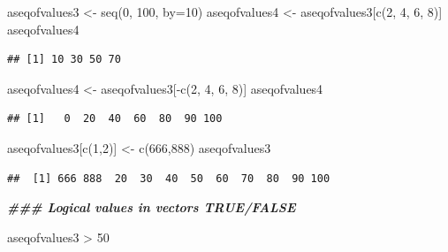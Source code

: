\documentclass[
]{book}
\newenvironment{Shaded}{\begin{snugshade}}{\end{snugshade}}
\newcommand{\AttributeTok}[1]{\textcolor[rgb]{0.77,0.63,0.00}{#1}}
\newcommand{\DecValTok}[1]{\textcolor[rgb]{0.00,0.00,0.81}{#1}}
\newcommand{\DocumentationTok}[1]{\textcolor[rgb]{0.56,0.35,0.01}{\textbf{\textit{#1}}}}
\newcommand{\FunctionTok}[1]{\textcolor[rgb]{0.00,0.00,0.00}{#1}}
\newcommand{\NormalTok}[1]{#1}
\newcommand{\OtherTok}[1]{\textcolor[rgb]{0.56,0.35,0.01}{#1}}
\newcommand{\SpecialCharTok}[1]{\textcolor[rgb]{0.00,0.00,0.00}{#1}}
\begin{document}
\begin{Shaded}
\begin{Highlighting}[]
\NormalTok{aseqofvalues3 }\OtherTok{\textless{}{-}} \FunctionTok{seq}\NormalTok{(}\DecValTok{0}\NormalTok{, }\DecValTok{100}\NormalTok{, }\AttributeTok{by=}\DecValTok{10}\NormalTok{)}
\NormalTok{aseqofvalues4 }\OtherTok{\textless{}{-}}\NormalTok{ aseqofvalues3[}\FunctionTok{c}\NormalTok{(}\DecValTok{2}\NormalTok{, }\DecValTok{4}\NormalTok{, }\DecValTok{6}\NormalTok{, }\DecValTok{8}\NormalTok{)]}
\NormalTok{aseqofvalues4}
\end{Highlighting}
\end{Shaded}

\begin{verbatim}
## [1] 10 30 50 70
\end{verbatim}

\begin{Shaded}
\begin{Highlighting}[]
\NormalTok{aseqofvalues4 }\OtherTok{\textless{}{-}}\NormalTok{ aseqofvalues3[}\SpecialCharTok{{-}}\FunctionTok{c}\NormalTok{(}\DecValTok{2}\NormalTok{, }\DecValTok{4}\NormalTok{, }\DecValTok{6}\NormalTok{, }\DecValTok{8}\NormalTok{)]}
\NormalTok{aseqofvalues4}
\end{Highlighting}
\end{Shaded}

\begin{verbatim}
## [1]   0  20  40  60  80  90 100
\end{verbatim}

\begin{Shaded}
\begin{Highlighting}[]
\NormalTok{aseqofvalues3[}\FunctionTok{c}\NormalTok{(}\DecValTok{1}\NormalTok{,}\DecValTok{2}\NormalTok{)] }\OtherTok{\textless{}{-}} \FunctionTok{c}\NormalTok{(}\DecValTok{666}\NormalTok{,}\DecValTok{888}\NormalTok{)}
\NormalTok{aseqofvalues3}
\end{Highlighting}
\end{Shaded}

\begin{verbatim}
##  [1] 666 888  20  30  40  50  60  70  80  90 100
\end{verbatim}

\begin{Shaded}
\begin{Highlighting}[]
\DocumentationTok{\#\#\# Logical values in vectors TRUE/FALSE}

\NormalTok{aseqofvalues3 }\SpecialCharTok{\textgreater{}} \DecValTok{50}
\end{Highlighting}
\end{Shaded}
\end{document}
